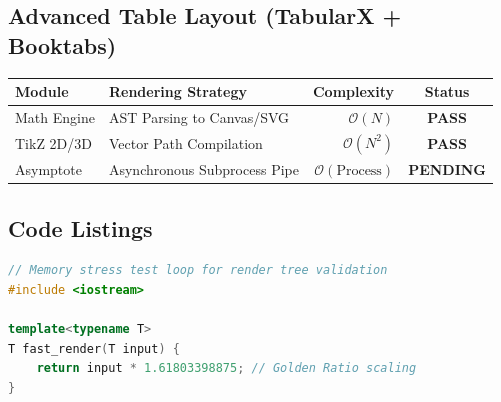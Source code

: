 \documentclass[12pt, a4paper]{article}
\begin{document}
\subsection{Advanced Table Layout (TabularX + Booktabs)}
\begin{table}[h]
\centering
\begin{tabularx}{\textwidth}{l X r c}
\toprule
\textbf{Module} & \textbf{Rendering Strategy} & \textbf{Complexity} & \textbf{Status} \\
\midrule
Math Engine & AST Parsing to Canvas/SVG & $\mathcal{O}(N)$ & \textcolor{green!60!black}{\textbf{PASS}} \\
TikZ 2D/3D  & Vector Path Compilation & $\mathcal{O}(N^2)$ & \textcolor{green!60!black}{\textbf{PASS}} \\
Asymptote   & Asynchronous Subprocess Pipe & $\mathcal{O}(\text{Process})$ & \textcolor{amber}{\textbf{PENDING}} \\
\bottomrule
\end{tabularx}
\end{table}

\subsection{Code Listings}
\begin{lstlisting}[language=C++]
// Memory stress test loop for render tree validation
#include <iostream>

template<typename T>
T fast_render(T input) {
    return input * 1.61803398875; // Golden Ratio scaling
}
\end{lstlisting}
\end{document}
